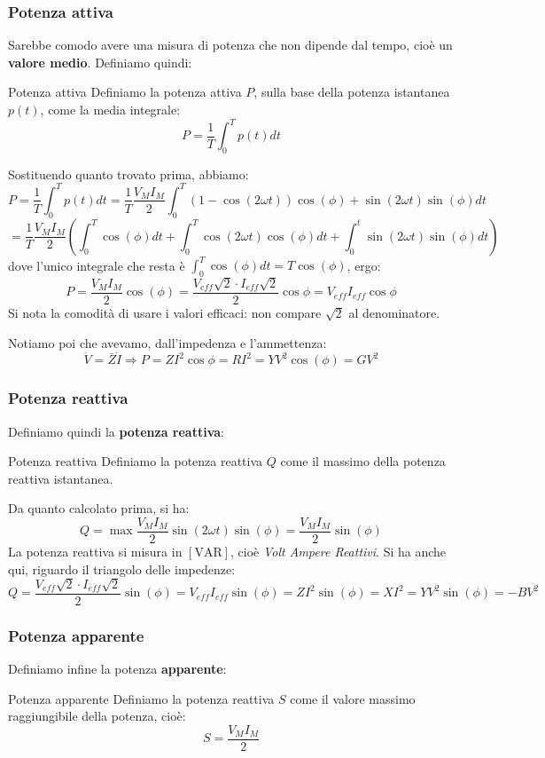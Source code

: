 \documentclass[a4paper,11pt]{article}
\begin{document}
\subsubsection{Potenza attiva}
Sarebbe comodo avere una misura di potenza che non dipende dal tempo, cioè un \textbf{valore medio}.
Definiamo quindi:
\begin{definition}{Potenza attiva}
	Definiamo la potenza attiva $P$, sulla base della potenza istantanea $p(t)$, come la media integrale:
	$$
		P = \frac{1}{T} \int_0^T p(t) dt
	$$
\end{definition}

Sostituendo quanto trovato prima, abbiamo:
$$
P = \frac{1}{T} \int_0^T p(t) dt = \frac{1}{T} \frac{V_M I_M}{2} \int_0^T \left( 1 - \cos(2\omega t) \right) \cos(\phi) +  \sin(2\omega t)\sin(\phi)  dt
$$
$$
= \frac{1}{T} \frac{V_M I_M}{2} \left( \int_0^T \cos(\phi) dt + \int_0^T \cos(2\omega t) \cos(\phi) dt + \int_0^t \sin(2\omega t)\sin(\phi)  dt \right) 
$$
dove l'unico integrale che resta è $\int_0^T \cos(\phi) dt = T \cos(\phi)$, ergo: 
$$
P= \frac{V_M I_M}{2} \cos(\phi) = \frac{V_{eff} \sqrt{2} \cdot I_{eff} \sqrt{2}}{2} \cos{\phi} = V_{eff}I_{eff} \cos{\phi}
$$
Si nota la comodità di usare i valori efficaci: non compare $\sqrt{2}$ al denominatore.

Notiamo poi che avevamo, dall'impedenza e l'ammettenza:
$$
\dot V = \bar{Z} \dot{I}  \Rightarrow P = Z I^2 \cos{\phi} = R I^2 = Y V^2 \cos(\phi) = G V^2 
$$

\subsubsection{Potenza reattiva}
Definiamo quindi la \textbf{potenza reattiva}:
\begin{definition}{Potenza reattiva}
	Definiamo la potenza reattiva $Q$ come il massimo della potenza reattiva istantanea.
\end{definition}

Da quanto calcolato prima, si ha:
$$
Q = \max{\frac{V_M I_M}{2} \sin(2\omega t)\sin(\phi)} = \frac{V_M I_M}{2} \sin(\phi)
$$
La potenza reattiva si misura in $[\mathrm{VAR}]$, cioè \textit{Volt Ampere Reattivi}.
Si ha anche qui, riguardo il triangolo delle impedenze:
$$
Q = \frac{V_{eff} \sqrt{2} \cdot I_{eff} \sqrt{2}}{2} \sin(\phi) = V_{eff}I_{eff} \sin(\phi) = ZI^2 \sin(\phi) = XI^2 = YV^2 \sin(\phi) = - BV^2
$$

\subsubsection{Potenza apparente}
Definiamo infine la potenza \textbf{apparente}:
\begin{definition}{Potenza apparente}
	Definiamo la potenza reattiva $S$ come il valore massimo raggiungibile della potenza, cioè:
	$$
	S = \frac{V_M I_M}{2}
	$$
\end{definition}
\end{document}
